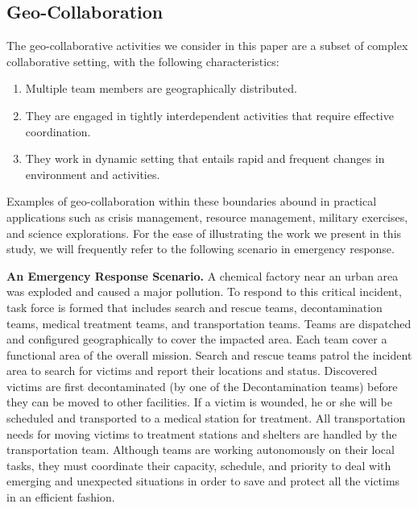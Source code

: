 \subsection{Geo-Collaboration} %
\label{sub:geo_collaboration}
The geo-collaborative activities we consider in this paper are a subset of complex collaborative setting, with the following characteristics: 

\begin{enumerate}
\item Multiple team members are geographically distributed.

\item They are engaged in tightly interdependent activities that require effective coordination.

\item They work in dynamic setting that entails rapid and frequent changes in environment and activities. 

\end{enumerate}

Examples of geo-collaboration within these boundaries abound in practical applications such as crisis management, resource management, military exercises, and science explorations. For the ease of illustrating the work we present in this study, we will frequently refer to the following scenario in emergency response.

\begin{scenario}
\textbf{An Emergency Response Scenario.} A chemical factory near an urban area was exploded and caused a major pollution. To respond to this critical incident, task force is formed that includes search and rescue teams, decontamination teams, medical treatment teams, and transportation teams. Teams are dispatched and configured geographically to cover the impacted area. Each team cover a functional area of the overall mission.  Search and rescue teams patrol the incident area to search for victims and report their locations and status. Discovered victims are first decontaminated (by one of the Decontamination teams) before they can be moved to other facilities.  If a victim is wounded, he or she will be scheduled and transported to a medical station for treatment. All transportation needs for moving victims to treatment stations and shelters are handled by the transportation team. Although teams are working autonomously on their local tasks, they must coordinate their capacity, schedule, and priority to deal with emerging and unexpected situations in order to save and protect all the victims in an efficient fashion.
\end{scenario}

